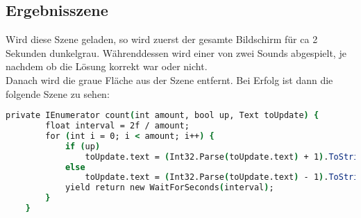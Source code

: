 \subsection{Ergebnisszene}
Wird diese Szene geladen, so wird zuerst der gesamte Bildschirm für ca 2 Sekunden dunkelgrau. Währenddessen wird einer von zwei Sounds abgespielt, je nachdem ob die Lösung korrekt war oder nicht.\\
Danach wird die graue Fläche aus der Szene entfernt. Bei Erfolg ist dann die folgende Szene zu sehen:
\begin{lstlisting}[language=csh, caption={Methode um Unity Texte hoch oder runter zu zählen}]
 private IEnumerator count(int amount, bool up, Text toUpdate) {
        float interval = 2f / amount;
        for (int i = 0; i < amount; i++) {
            if (up)
                toUpdate.text = (Int32.Parse(toUpdate.text) + 1).ToString();
            else
                toUpdate.text = (Int32.Parse(toUpdate.text) - 1).ToString();
            yield return new WaitForSeconds(interval);
        }
    }
\end{lstlisting}
